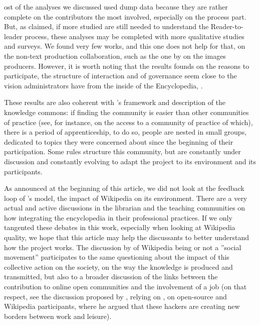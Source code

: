 ost of the analyses we discussed used dump data because they are
rather complete on the contributors the most involved, especially
on the process part. But, as \citet{PreeceShneiderman09} claimed,
if more studied are still needed to understand the Reader-to-leader
process, these analyses may be completed with more qualitative studies
and surveys. We found very few works, and this one does not help for
that, on the non-text production collaboration, such as the one by
\citet{Viegas07} on the images producers. However, it is worth noting
that the results founds on the reasons to participate, the structure
of interaction and of governance seem close to the vision administrators
have from the inside of the Encyclopedia, \citep[See][on the interview of Swedish Wikipedia Administrators]{Mattus09}.

These results are also coherent with \citet{OstromHess06}'s framework
and description of the knowledge commons: if finding the community
is easier than other communities of practice (see, for instance, \citealp{MerriamCourtenayBaumgartner03}
on the access to a community of practice of which), there is a period
of apprenticeship, to do so, people are nested in small groups, dedicated
to topics they were concerned about since the beginning of their participation.
Some rules structure this community, but are constantly under discussion
and constantly evolving to adapt the project to its environment and
its participants.

As announced at the beginning of this article, we did not look at
the feedback loop of \citeauthor{HessOstrom06b}'s model, the impact
of Wikipedia on its environment. There are a very actual and active
discussions in the librarian and the teaching communities on how integrating
the encyclopedia in their professional practices. If we only tangented
these debates in this work, especially when looking at Wikipedia quality,
we hope that this article may help the discussants to better understand
how the project works. The discussion by \citet{Konieczny09b} of
Wikipedia being or not a ''social movement'' participates to the
same questioning about the impact of this collective action on the
society, on the way the knowledge is produced and transmitted, but
also to a broader discussion of the links between the contribution
to online open communities and the involvement of a job (on that respect,
see the discussion proposed by \citet{Brown08}, relying on \citet{Himanen02},
on open-source and Wikipedia participants, where he argued that these
hackers are creating new borders between work and leisure).

